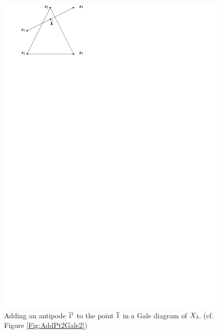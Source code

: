         \begin{figure}[p!hbt]
            \centering
                \includegraphics[width=.8\textwidth, page=17]{pictures.pdf}
            \caption{Adding an antipode $\overline{1'}$ to the point $\overline{1}$ in a Gale diagram of $X_{3}$. (cf.{} Figure \ref{Fig:AddPt2Gale2})\label{Fig:AddPt2Gale1}}
        \end{figure}

